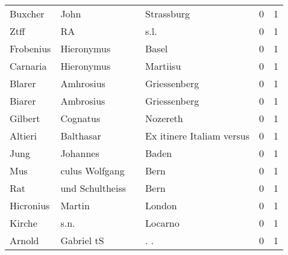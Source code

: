 \documentclass[10pt,a4paper,landscape]{article}
\begin{document}
\begin{longtable}{llllrr}
                  Buxcher &                               John &             &                                  Strassburg &          0 &         1 \\
                     Ztff &                                 RA &             &                                        s.l. &          0 &         1 \\
                Frobenius &                         Hieronymus &             &                                       Basel &          0 &         1 \\
                 Carnaria &                         Hieronymus &             &                                    Martiisu &          0 &         1 \\
                   Blarer &                          Amhrosius &             &                                Griessenberg &          0 &         1 \\
                   Biarer &                          Ambrosius &             &                                Griessenberg &          0 &         1 \\
                  Gilbert &                           Cognatus &             &                                    Nozereth &          0 &         1 \\
                  Altieri &                          Balthasar &             &                   Ex itinere Italiam versus &          0 &         1 \\
                     Jung &                           Johannes &             &                                       Baden &          0 &         1 \\
                      Mus &                     culus Wolfgang &             &                                        Bern &          0 &         1 \\
                      Rat &                    und Schultheiss &             &                                        Bern &          0 &         1 \\
                Hicronius &                             Martin &             &                                      London &          0 &         1 \\
                   Kirche &                               s.n. &             &                                     Locarno &          0 &         1 \\
                   Arnold &                         Gabriel tS &             &                                        . .  &          0 &         1 \\

\end{longtable}
\end{document}
